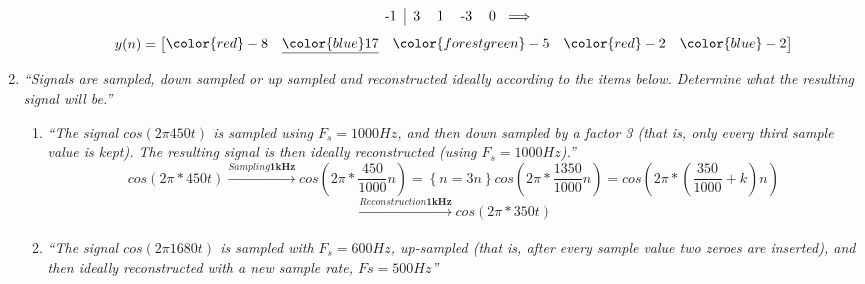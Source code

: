 \documentclass{article}
\begin{document}
\begin{enumerate}
\begin{enumerate}
\begin{displaymath}
\begin{tabular}{c|ccccc ccccc}
                        -1 & 3 & 1 & -3 & 0 \\
                    \end{tabular}
                    \Longrightarrow
                \end{displaymath}
                \begin{displaymath}
                    y(n)=
                    \begin{bmatrix}
                        \color{red}-8 & \underline{\color{blue}17} & \color{forestgreen}-5 & \color{red}-2 &\color{blue} -2
                    \end{bmatrix}
                \end{displaymath}
               
                
        \end{enumerate}

    \item %
        \emph{``Signals are sampled, down sampled or up sampled and reconstructed ideally according to the items below. Determine what the resulting signal will be.''}
        \begin{enumerate}
            \item %
                \emph{``The signal $cos(2\pi450t)$ is sampled using $F_s = 1000Hz$, and then down sampled by a
                        factor 3 (that is, only every third sample value is kept). The resulting signal is then
                        ideally reconstructed (using $F_s = 1000 Hz$).''}
                \\
                \begin{displaymath}
                    cos(2\pi*450t) \xrightarrow[]{Sampling \textbf{1kHz}} cos(2\pi*\frac{450}{1000}n) = 
                    \left\{ n=3n \right\} cos(2\pi*\frac{1350}{1000}n) = 
                    cos(2\pi* ( \frac{350}{1000} + k )n)
                \end{displaymath}
                \begin{displaymath}
                    \xrightarrow[]{Reconstruction \textbf{1kHz}} cos(2\pi*350t) 
                \end{displaymath}

            \item %
                \emph{``The signal $cos(2\pi1680t)$ is sampled with $F_s = 600 Hz$, up-sampled (that is, after
                        every sample value two zeroes are inserted), and then ideally reconstructed with a
                        new sample rate, $Fs = 500 Hz$''}
                \\


\end{enumerate}
\end{enumerate}
\end{document}
